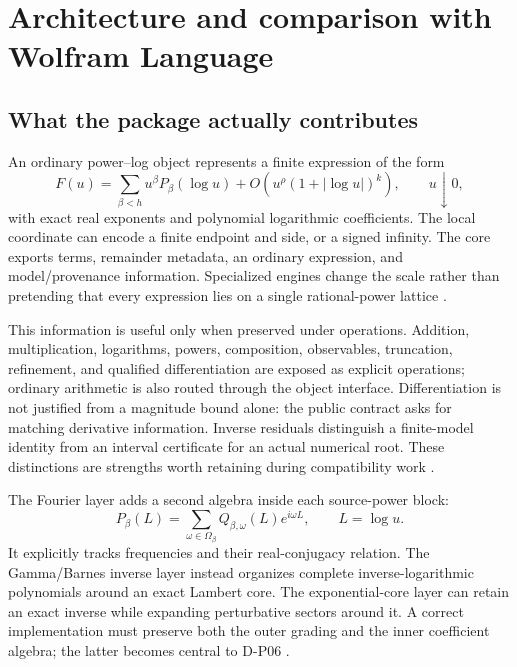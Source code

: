 \documentclass[11pt,a4paper]{article}
\theoremstyle{remark}
\begin{document}
\section{Architecture and comparison with Wolfram Language}
\subsection{What the package actually contributes}

An ordinary power--log object represents a finite expression of the form
\begin{equation}\label{eq:ordinary}
 F(u)=\sum_{\beta<h}u^\beta P_\beta(\log u)
 +O\!\left(u^\rho(1+|\log u|)^k\right),\qquad u\downarrow0,
\end{equation}
with exact real exponents and polynomial logarithmic coefficients. The local coordinate can encode a finite endpoint and side, or a signed infinity. The core exports terms, remainder metadata, an ordinary expression, and model/provenance information. Specialized engines change the scale rather than pretending that every expression lies on a single rational-power lattice \cite{core,fourier,gammainverse,expcore}.

This information is useful only when preserved under operations. Addition, multiplication, logarithms, powers, composition, observables, truncation, refinement, and qualified differentiation are exposed as explicit operations; ordinary arithmetic is also routed through the object interface. Differentiation is not justified from a magnitude bound alone: the public contract asks for matching derivative information. Inverse residuals distinguish a finite-model identity from an interval certificate for an actual numerical root. These distinctions are strengths worth retaining during compatibility work \cite{core,status}.

The Fourier layer adds a second algebra inside each source-power block:
\begin{equation}\label{eq:fourier}
 P_\beta(L)=\sum_{\omega\in\Omega_\beta}Q_{\beta,\omega}(L)e^{i\omega L},
 \qquad L=\log u.
\end{equation}
It explicitly tracks frequencies and their real-conjugacy relation. The Gamma/Barnes inverse layer instead organizes complete inverse-logarithmic polynomials around an exact Lambert core. The exponential-core layer can retain an exact inverse while expanding perturbative sectors around it. A correct implementation must preserve both the outer grading and the inner coefficient algebra; the latter becomes central to D-P06 \cite{fourier,gammainverse,expcore}.
\end{document}
